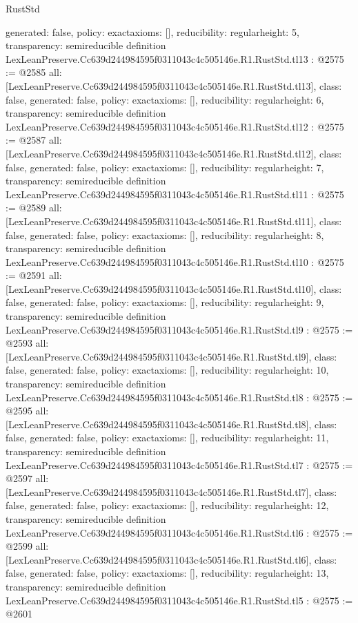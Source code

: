 \begin{lexlean}{RustStd}
\begin{coremodule}
{  generated: false,
  policy: exact{axioms: []},
  reducibility: regular{height: 5},
  transparency: semireducible
}
definition LexLeanPreserve.Cc639d244984595f0311043c4c505146e.R1.RustStd.tl13 : @2575 := @2585 {
  all: [LexLeanPreserve.Cc639d244984595f0311043c4c505146e.R1.RustStd.tl13],
  class: false,
  generated: false,
  policy: exact{axioms: []},
  reducibility: regular{height: 6},
  transparency: semireducible
}
definition LexLeanPreserve.Cc639d244984595f0311043c4c505146e.R1.RustStd.tl12 : @2575 := @2587 {
  all: [LexLeanPreserve.Cc639d244984595f0311043c4c505146e.R1.RustStd.tl12],
  class: false,
  generated: false,
  policy: exact{axioms: []},
  reducibility: regular{height: 7},
  transparency: semireducible
}
definition LexLeanPreserve.Cc639d244984595f0311043c4c505146e.R1.RustStd.tl11 : @2575 := @2589 {
  all: [LexLeanPreserve.Cc639d244984595f0311043c4c505146e.R1.RustStd.tl11],
  class: false,
  generated: false,
  policy: exact{axioms: []},
  reducibility: regular{height: 8},
  transparency: semireducible
}
definition LexLeanPreserve.Cc639d244984595f0311043c4c505146e.R1.RustStd.tl10 : @2575 := @2591 {
  all: [LexLeanPreserve.Cc639d244984595f0311043c4c505146e.R1.RustStd.tl10],
  class: false,
  generated: false,
  policy: exact{axioms: []},
  reducibility: regular{height: 9},
  transparency: semireducible
}
definition LexLeanPreserve.Cc639d244984595f0311043c4c505146e.R1.RustStd.tl9 : @2575 := @2593 {
  all: [LexLeanPreserve.Cc639d244984595f0311043c4c505146e.R1.RustStd.tl9],
  class: false,
  generated: false,
  policy: exact{axioms: []},
  reducibility: regular{height: 10},
  transparency: semireducible
}
definition LexLeanPreserve.Cc639d244984595f0311043c4c505146e.R1.RustStd.tl8 : @2575 := @2595 {
  all: [LexLeanPreserve.Cc639d244984595f0311043c4c505146e.R1.RustStd.tl8],
  class: false,
  generated: false,
  policy: exact{axioms: []},
  reducibility: regular{height: 11},
  transparency: semireducible
}
definition LexLeanPreserve.Cc639d244984595f0311043c4c505146e.R1.RustStd.tl7 : @2575 := @2597 {
  all: [LexLeanPreserve.Cc639d244984595f0311043c4c505146e.R1.RustStd.tl7],
  class: false,
  generated: false,
  policy: exact{axioms: []},
  reducibility: regular{height: 12},
  transparency: semireducible
}
definition LexLeanPreserve.Cc639d244984595f0311043c4c505146e.R1.RustStd.tl6 : @2575 := @2599 {
  all: [LexLeanPreserve.Cc639d244984595f0311043c4c505146e.R1.RustStd.tl6],
  class: false,
  generated: false,
  policy: exact{axioms: []},
  reducibility: regular{height: 13},
  transparency: semireducible
}
definition LexLeanPreserve.Cc639d244984595f0311043c4c505146e.R1.RustStd.tl5 : @2575 := @2601 {
}
\end{coremodule}
\end{lexlean}
